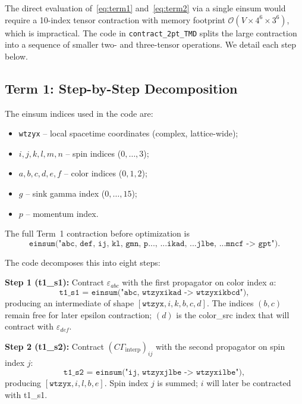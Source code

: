 \documentclass[11pt,a4paper]{article}
\newcommand{\eps}{\varepsilon}
\newcommand{\Gint}{\Gamma_{\text{interp}}}
\newcommand{\Cmat}{C}
\begin{document}
The direct evaluation of~\eqref{eq:term1} and~\eqref{eq:term2} via a single einsum
would require a 10-index tensor contraction with memory footprint
$\mathcal{O}(V \times 4^{6} \times 3^{6})$, which is impractical.  The code in
\texttt{contract\_2pt\_TMD} splits the large contraction into a sequence of
smaller two- and three-tensor operations.  We detail each step below.

\subsection{Term 1: Step-by-Step Decomposition}

The einsum indices used in the code are:
\begin{itemize}
  \item \texttt{wtzyx} -- local spacetime coordinates (complex, lattice-wide);
  \item $i,j,k,l,m,n$ -- spin indices ($0,\dots,3$);
  \item $a,b,c,d,e,f$ -- color indices ($0,1,2$);
  \item $g$ -- sink gamma index ($0,\dots,15$);
  \item $p$ -- momentum index.
\end{itemize}

The full Term~1 contraction before optimization is
\begin{equation}
  \texttt{einsum("abc, def, ij, kl, gmn, p..., ...ikad, ...jlbe, ...mncf -> gpt")}.
\end{equation}

The code decomposes this into eight steps:

\medskip\noindent
\textbf{Step 1 (t1\_s1):} Contract $\eps_{abc}$ with the first propagator on
color index $a$:
\begin{equation}
  \texttt{t1\_s1 = einsum("abc, wtzyxikad -> wtzyxikbcd")},
\end{equation}
producing an intermediate of shape $[\texttt{wtzyx},i,k,b,c,d]$.  The indices
$(b,c)$ remain free for later epsilon contraction; $(d)$ is the color\_src index
that will contract with $\eps_{def}$.

\medskip\noindent
\textbf{Step 2 (t1\_s2):} Contract $(\Cmat\Gint)_{ij}$ with the second propagator
on spin index $j$:
\begin{equation}
  \texttt{t1\_s2 = einsum("ij, wtzyxjlbe -> wtzyxilbe")},
\end{equation}
producing $[\texttt{wtzyx},i,l,b,e]$.  Spin index $j$ is summed; $i$ will later
be contracted with t1\_s1.
\end{document}
